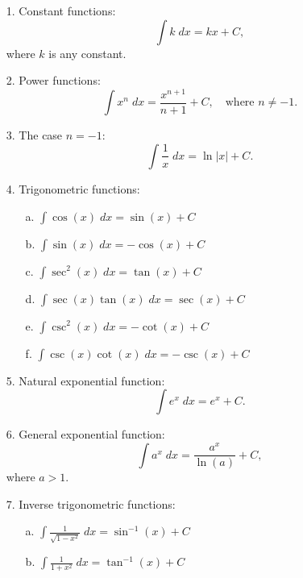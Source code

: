 \documentclass[handout]{ximera}
\begin{document}
\begin{enumerate}


\item[1.] Constant functions:
\[
\int k \; dx = kx + C,
\]
where $k$ is any constant.

\item[2.] Power functions:
\[
\int x^n \; dx = \frac{x^{n+1}}{n+1} + C, \quad \text{where $n\neq -1$.}
\]


\item[3.] The case $n = -1$:
\[
 \int \frac{1}{x} \; dx = \ln|x| + C.
\]

\item[4.] Trigonometric functions:

\begin{enumerate}

\item[a.] $\displaystyle{\int \cos(x) \; dx = \sin(x) + C}$
\item[b.] $\displaystyle{\int \sin(x) \; dx = -\cos(x) + C}$
\item[c.] $\displaystyle{\int \sec^2(x) \; dx = \tan(x) + C}$
\item[d.] $\displaystyle{\int \sec(x) \tan(x) \; dx = \sec(x) + C}$
\item[e.] $\displaystyle{\int \csc^2(x) \; dx = -\cot(x) + C}$
\item[f.] $\displaystyle{\int \csc(x) \cot(x) \; dx = -\csc(x) + C}$
 
\end{enumerate}


\item[5.] Natural exponential function:
\[
\int e^x \; dx = e^x + C.
\]

\item[6.] General exponential function:
\[
\int a^x \; dx = \frac{a^x}{\ln(a)} + C,
\]
where $a > 1$.

\item[7.] Inverse trigonometric functions:

\begin{enumerate}

\item[a.] $\displaystyle{\int \frac{1}{\sqrt{1-x^2}} \; dx = \sin^{-1}(x) + C}$
\item[b.] $\displaystyle{\int \frac{1}{1+x^2} \; dx = \tan^{-1}(x) + C}$

\end{enumerate}


\end{enumerate}
\end{document}
